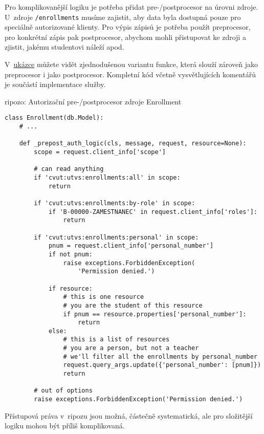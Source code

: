 Pro komplikovanější logiku je potřeba přidat pre-/postprocesor na úrovni zdroje. U~zdroje \verb!/enrollments! musíme zajistit, aby data byla dostupná pouze pro speciálně autorizované klienty. Pro výpis zápisů je potřeba použít preprocesor, pro konkrétní zápis pak postprocesor, abychom mohli přistupovat ke zdroji a zjistit, jakému studentovi náleží apod.

V~\protect\hyperlink{code:ripozo:auth2}{ukázce} můžete vidět zjednodušenou variantu funkce, která slouží zároveň jako preprocesor i jako postprocesor. Kompletní kód včetně vysvětlujících komentářů je součástí implementace služby.

\begin{listing}[htbp]
\caption{{\label{code:ripozo:auth2}ripozo: Autorizační pre-/postprocesor zdroje Enrollment}}
\begin{verbatim}
class Enrollment(db.Model):
    # ...

    def _prepost_auth_logic(cls, message, request, resource=None):
        scope = request.client_info['scope']

        # can read anything
        if 'cvut:utvs:enrollments:all' in scope:
            return

        if 'cvut:utvs:enrollments:by-role' in scope:
            if 'B-00000-ZAMESTNANEC' in request.client_info['roles']:
                return

        if 'cvut:utvs:enrollments:personal' in scope:
            pnum = request.client_info['personal_number']
            if not pnum:
                raise exceptions.ForbiddenException(
                    'Permission denied.')

            if resource:
                # this is one resource
                # you are the student of this resource
                if pnum == resource.properties['personal_number']:
                    return
            else:
                # this is a list of resources
                # you are a person, but not a teacher
                # we'll filter all the enrollments by personal_number
                request.query_args.update({'personal_number': [pnum]})
                return

        # out of options
        raise exceptions.ForbiddenException('Permission denied.')
\end{verbatim}
\end{listing}

Přístupová práva v~ripozu jsou možná, částečně systematická, ale pro složitější logiku mohou být příliš komplikovaná.

